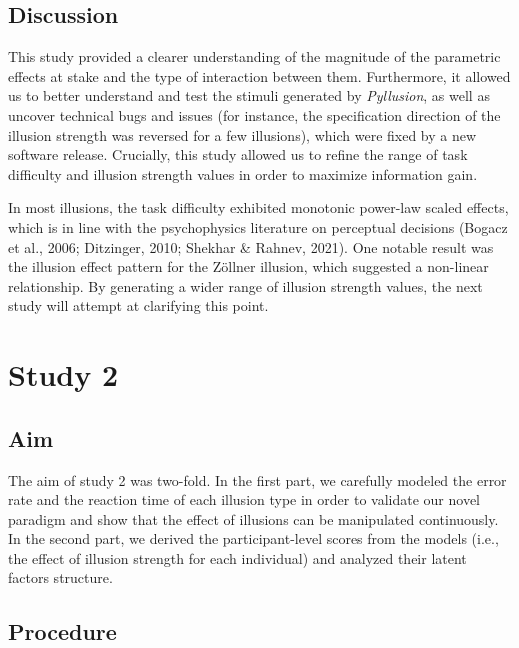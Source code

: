 \documentclass[
  man,floatsintext]{apa6}
\begin{document}
\hypertarget{discussion}{%
\subsection{Discussion}\label{discussion}}

This study provided a clearer understanding of the magnitude of the parametric effects at stake and the type of interaction between them. Furthermore, it allowed us to better understand and test the stimuli generated by \emph{Pyllusion}, as well as uncover technical bugs and issues (for instance, the specification direction of the illusion strength was reversed for a few illusions), which were fixed by a new software release. Crucially, this study allowed us to refine the range of task difficulty and illusion strength values in order to maximize information gain.

In most illusions, the task difficulty exhibited monotonic power-law scaled effects, which is in line with the psychophysics literature on perceptual decisions (Bogacz et al., 2006; Ditzinger, 2010; Shekhar \& Rahnev, 2021). One notable result was the illusion effect pattern for the Zöllner illusion, which suggested a non-linear relationship. By generating a wider range of illusion strength values, the next study will attempt at clarifying this point.

\hypertarget{study-2}{%
\section{Study 2}\label{study-2}}

\hypertarget{aim-1}{%
\subsection{Aim}\label{aim-1}}

The aim of study 2 was two-fold. In the first part, we carefully modeled the error rate and the reaction time of each illusion type in order to validate our novel paradigm and show that the effect of illusions can be manipulated continuously. In the second part, we derived the participant-level scores from the models (i.e., the effect of illusion strength for each individual) and analyzed their latent factors structure.

\hypertarget{procedure-1}{%
\subsection{Procedure}\label{procedure-1}}
\end{document}
